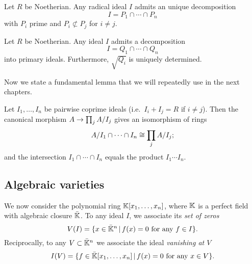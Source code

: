 \begin{proposition}
  Let $R$ be Noetherian. Any radical ideal $I$ admits an unique
  decomposition
  \begin{equation}
    \label{eq:213}
    I = P_1\cap\cdots\cap P_n
  \end{equation}
  with $P_i$ prime and $P_i\not\subset P_j$ for $i\ne j$.
\end{proposition}

\begin{theorem}
  Let $R$ be Noetherian. Any ideal $I$
  admits a decomposition
  \begin{equation}
    \label{eq:214}
    I = Q_1\cap\cdots\cap Q_n
  \end{equation}
  into primary ideals. Furthermore, $\sqrt{Q_i}$ is uniquely
  determined.
\end{theorem}

Now we state a fundamental lemma that we will repeatedly use in the
next chapters.

\begin{lemma}
  \label{th:chinese-remainder}
  Let $I_1,\ldots,I_n$ be pairwise coprime ideals (i.e.\ $I_i+I_j=R$ if
  $i\ne j$).  Then the canonical morphism $A\rightarrow\prod_j A/I_j$ gives an
  isomorphism of rings
  \begin{equation}
    \label{eq:211}
    A/I_1\cap\cdots\cap I_n \cong \prod_j A/I_j
    \text{;}
  \end{equation}
  and the intersection $I_1\cap\cdots\cap I_n$ equals the product
  $I_1\cdots I_n$.
\end{lemma}


\subsection{Algebraic varieties}
\label{sec:algebraic-varieties}
  We now consider the polynomial ring $\mathbb{K}[x_1,\ldots,x_n]$,
where $\mathbb{K}$ is a perfect field with algebraic closure $\bar{\mathbb{K}}$. To
any ideal $I$, we associate its
\emph{set of zeros}
\begin{equation}
  \label{eq:215}
  V(I) = \{x\in\bar{\mathbb{K}}^n \,|\, f(x) = 0 \text{ for any } f\in I\}
  \text{.}
\end{equation}
 Reciprocally, to
any $V\subset\bar{\mathbb{K}}^n$ we associate the ideal
\emph{vanishing at $V$}
\begin{equation}
  \label{eq:216}
  I(V) = \{f\in\bar{\mathbb{K}}[x_1,\ldots,x_n] \,|\, f(x) = 0 \text{ for any } x\in V\}
  \text{.}
\end{equation}


